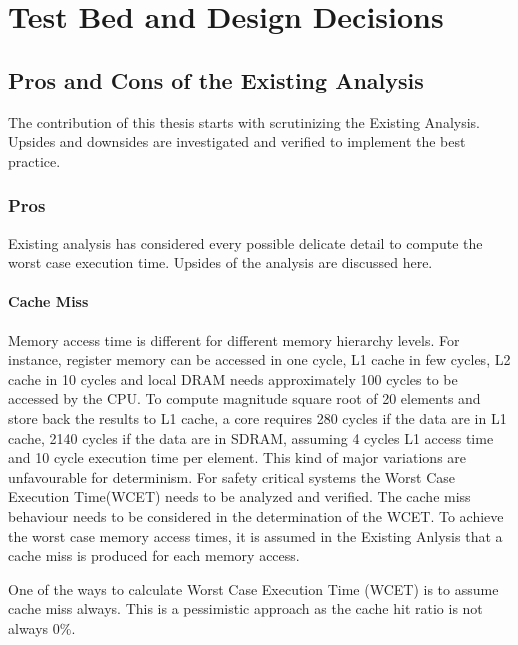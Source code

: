 \chapter{Test Bed and Design Decisions}
\label{chap:testbed}

\section{Pros and Cons of the Existing Analysis}
\label{sec:mm:pros_n_cons}
The contribution of this thesis starts with scrutinizing the Existing Analysis. Upsides and downsides are investigated and verified to implement the best practice.
\subsection{Pros}
\label{mm:pros}
Existing analysis has considered every possible delicate detail to compute the worst case execution time. Upsides of the analysis are discussed here.

\subsubsection{Cache Miss}
Memory access time is different for different memory hierarchy levels. For instance, register memory can be accessed in one cycle, L1 cache in few cycles, L2 cache in 10 cycles and local DRAM needs approximately 100 cycles to be accessed by the CPU. To compute magnitude square root of 20 elements and store back the results to L1 cache, a core requires 280 cycles if the data are in L1 cache, 2140 cycles if the data are in SDRAM, assuming 4 cycles L1 access time and 10 cycle execution time per element. This kind of major variations are unfavourable for determinism. For safety critical systems the Worst Case Execution Time(WCET) needs to be analyzed and verified. The cache miss behaviour needs to be considered in the determination of the WCET. To achieve the worst case memory access times, it is assumed in the Existing Anlysis that a cache miss is produced for each memory access.

One of the ways to calculate Worst Case Execution Time (WCET) is to assume cache miss always. This is a pessimistic approach as the cache hit ratio is not always 0\%. 

